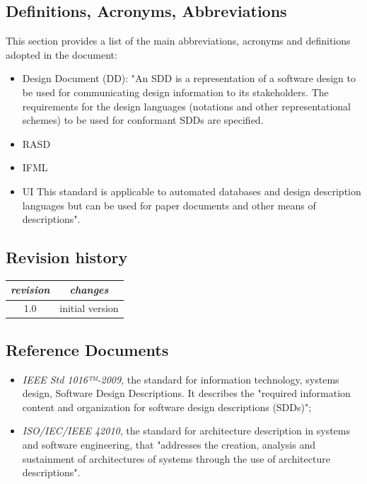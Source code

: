 \documentclass{article}
\begin{document}
\subsection{Definitions, Acronyms, Abbreviations}\label{Abbreviations}
This section provides a list of the main abbreviations, acronyms and definitions adopted in the document:
\begin{itemize}
    \item Design Document (DD): "An SDD is a representation of a software design to be used for communicating design information to its stakeholders. The requirements for the design languages (notations and other representational schemes) to be used for conformant SDDs are specified.
    \item RASD
    \item IFML
    \item UI
This standard is applicable to automated databases and design description languages but can be
used for paper documents and other means of descriptions".
\end{itemize}
\subsection{Revision history}
\raggedright
\begin{tabular}{ |c | c |}
\hline
 \textit{revision} & \textit{changes} \\ 
 \hline
 1.0 &  initial version\\ 
 \hline
\end{tabular}
\subsection{Reference Documents}
\begin{itemize}
    \item \textit{IEEE Std 1016™-2009}, the standard for information technology, systems design, Software Design Descriptions. It describes the "required information content and organization for software design descriptions (SDDs)";
    \item \textit{ISO/IEC/IEEE 42010}, the standard for architecture description in systems and software engineering, that "addresses the creation, analysis and sustainment of architectures of systems
through the use of architecture descriptions".
\end{itemize}
\end{document}

